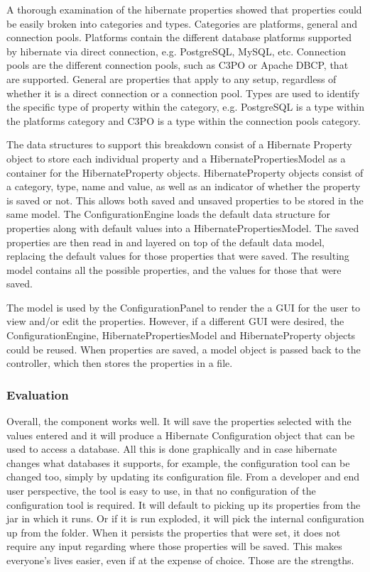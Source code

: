 A thorough examination of the hibernate properties showed that properties could be easily broken into categories and types. Categories are platforms, general and connection pools. Platforms contain the different database platforms supported by hibernate via direct connection, e.g. PostgreSQL, MySQL, etc. Connection pools are the different connection pools, such as C3PO or Apache DBCP, that are supported. General are properties that apply to any setup, regardless of whether it is a direct connection or a connection pool. Types are used to identify the specific type of property within the category, e.g. PostgreSQL is a type within the platforms category and C3PO is a type within the connection pools category.

The data structures to support this breakdown consist of a Hibernate Property object to store each individual property and a HibernatePropertiesModel as a container for the HibernateProperty objects. HibernateProperty objects consist of a category, type, name and value, as well as an indicator of whether the property is saved or not. This allows both saved and unsaved properties to be stored in the same model. The ConfigurationEngine loads the default data structure for properties along with default values into a HibernatePropertiesModel. The saved properties are then read in and layered on top of the default data model, replacing the default values for those properties that were saved. The resulting model contains all the possible properties, and the values for those that were saved. 

The model is used by the ConfigurationPanel to render the a GUI for the user to view and/or edit the properties. However, if a different GUI were desired, the  ConfigurationEngine, HibernatePropertiesModel and HibernateProperty objects could be reused. When properties are saved, a model object is passed back to the controller, which then stores the properties in a file.

\subsubsection{Evaluation}
Overall, the component works well. It will save the properties selected with the values entered and it will produce a Hibernate Configuration object that can be used to access a database. All this is done graphically and in case hibernate changes what databases it supports, for example, the configuration tool can be changed too, simply by updating its configuration file. From a developer and end user perspective, the tool is easy to use, in that no configuration of the configuration tool is required. It will default to picking up its properties from the jar in which it runs. Or if it is run exploded, it will pick the internal configuration up from the folder. When it persists the properties that were set, it does not require any input regarding where those properties will be saved. This makes everyone's lives easier, even if at the expense of choice. Those are the strengths. 

